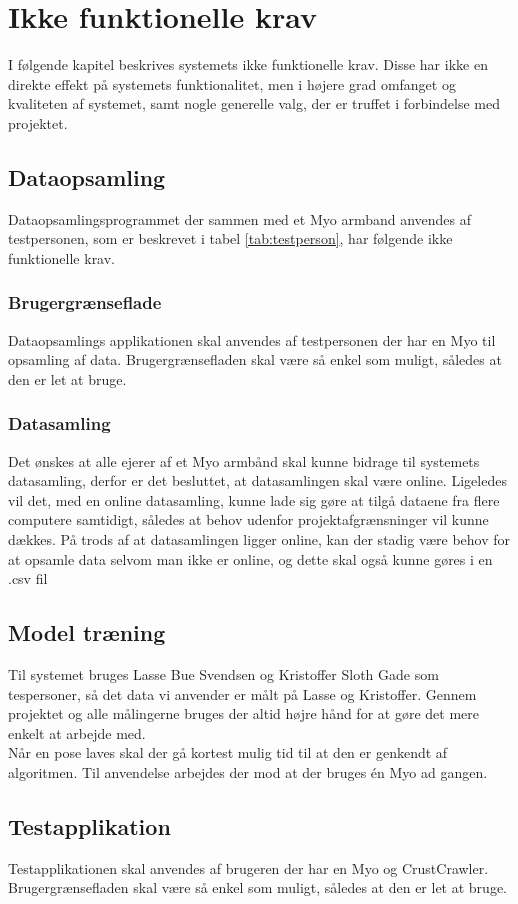 \chapter{Ikke funktionelle krav}
I følgende kapitel beskrives systemets ikke funktionelle krav. Disse har ikke en direkte effekt på systemets funktionalitet, men i højere grad omfanget og kvaliteten af systemet, samt nogle generelle valg, der er truffet i forbindelse med projektet.

\section{Dataopsamling}
Dataopsamlingsprogrammet der sammen med et Myo armband anvendes af testpersonen, som er beskrevet i tabel \ref{tab:testperson}, har følgende ikke funktionelle krav.

\subsection{Brugergrænseflade}
Dataopsamlings applikationen skal anvendes af testpersonen der har en Myo til opsamling af data. Brugergrænsefladen skal være så enkel som muligt, således at den er let at bruge.

\subsection{Datasamling}
Det ønskes at alle ejerer af et Myo armbånd skal kunne bidrage til systemets datasamling, derfor er det besluttet, at datasamlingen skal være online. Ligeledes vil det, med en online datasamling, kunne lade sig gøre at tilgå dataene fra flere computere samtidigt, således at behov udenfor projektafgrænsninger vil kunne dækkes. På trods af at datasamlingen ligger online, kan der stadig være behov for at opsamle data selvom man ikke er online, og dette skal også kunne gøres i en .csv fil

\section{Model træning}
Til systemet bruges Lasse Bue Svendsen og Kristoffer Sloth Gade som tespersoner, så det data vi anvender er målt på Lasse og Kristoffer. Gennem projektet og alle målingerne bruges der altid højre hånd for at gøre det mere enkelt at arbejde med.\\
Når en pose laves skal der gå kortest mulig tid til at den er genkendt af algoritmen. Til anvendelse arbejdes der mod at der bruges én Myo ad gangen.


\section{Testapplikation}
Testapplikationen skal anvendes af brugeren der har en Myo og CrustCrawler. Brugergrænsefladen skal være så enkel som muligt, således at den er let at bruge.